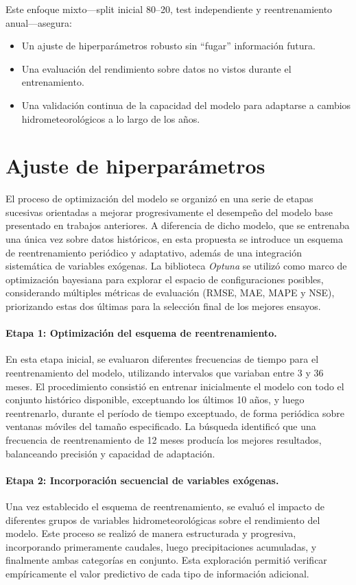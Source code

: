 Este enfoque mixto—split inicial 80–20, test independiente y reentrenamiento anual—asegura:
\begin{itemize}
  \item Un ajuste de hiperparámetros robusto sin “fugar” información futura.  
  \item Una evaluación del rendimiento sobre datos no vistos durante el entrenamiento.  
  \item Una validación continua de la capacidad del modelo para adaptarse a cambios hidrometeorológicos a lo largo de los años.
\end{itemize}

\section{Ajuste de hiperparámetros} \label{ssec:ajuste_hiperparametros}

El proceso de optimización del modelo se organizó en una serie de etapas sucesivas orientadas a mejorar progresivamente el desempeño del modelo base presentado en trabajos anteriores. A diferencia de dicho modelo, que se entrenaba una única vez sobre datos históricos, en esta propuesta se introduce un esquema de reentrenamiento periódico y adaptativo, además de una integración sistemática de variables exógenas. La biblioteca \textit{Optuna} se utilizó como marco de optimización bayesiana para explorar el espacio de configuraciones posibles, considerando múltiples métricas de evaluación (RMSE, MAE, MAPE y NSE), priorizando estas dos últimas para la selección final de los mejores ensayos.

\paragraph{Etapa 1: Optimización del esquema de reentrenamiento.}
En esta etapa inicial, se evaluaron diferentes frecuencias de tiempo para el reentrenamiento del modelo, utilizando intervalos que variaban entre 3 y 36 meses. El procedimiento consistió en entrenar inicialmente el modelo con todo el conjunto histórico disponible, exceptuando los últimos 10 años, y luego reentrenarlo, durante el período de tiempo exceptuado, de forma periódica sobre ventanas móviles del tamaño especificado. La búsqueda identificó que una frecuencia de reentrenamiento de 12 meses producía los mejores resultados, balanceando precisión y capacidad de adaptación.

\paragraph{Etapa 2: Incorporación secuencial de variables exógenas.}
Una vez establecido el esquema de reentrenamiento, se evaluó el impacto de diferentes grupos de variables hidrometeorológicas sobre el rendimiento del modelo. Este proceso se realizó de manera estructurada y progresiva, incorporando primeramente caudales, luego precipitaciones acumuladas, y finalmente ambas categorías en conjunto. Esta exploración permitió verificar empíricamente el valor predictivo de cada tipo de información adicional.

